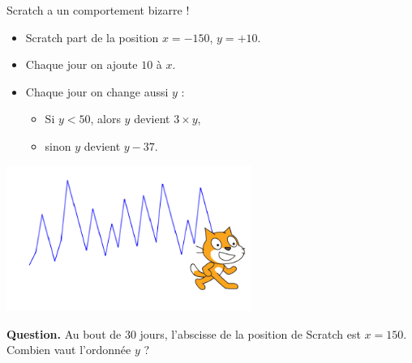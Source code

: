 \documentclass[class=report,crop=false, 12pt]{standalone}
\begin{document}
\begin{enigme}

Scratch a un comportement bizarre !

\begin{itemize}
  \item Scratch part de la position $x=-150$, $y=+10$.
  
  \item Chaque jour on ajoute $10$ à $x$.
  
  \item Chaque jour on change aussi $y$ :
  \begin{itemize}
    \item Si $y<50$, alors $y$ devient $3 \times y$,
    \item sinon $y$ devient $y - 37$.
  \end{itemize}
  
\end{itemize}


\begin{center}
  \includegraphics[width=0.6\textwidth]{ecran-07-eg2} 
\end{center}




\bigskip

\textbf{Question.} Au bout de $30$ jours, l'abscisse de la position de Scratch est $x=150$.
Combien vaut l'ordonnée $y$ ?

\bigskip



\end{enigme}
\end{document}
